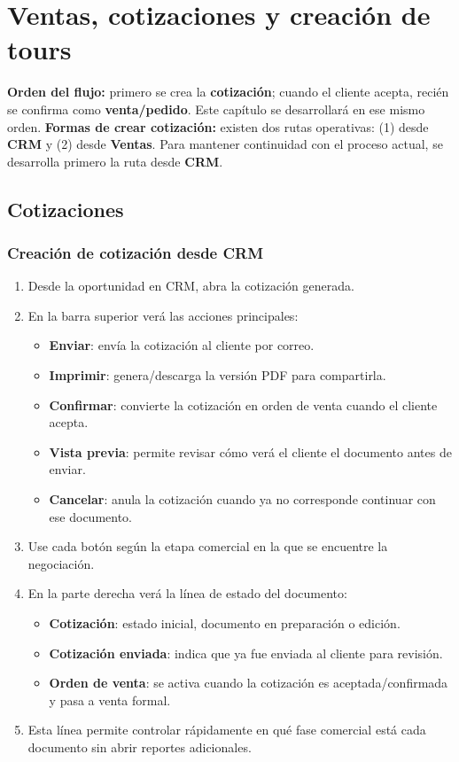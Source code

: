 \section{Ventas, cotizaciones y creación de tours}

\noindent\textbf{Orden del flujo:} primero se crea la \textbf{cotización}; cuando el cliente acepta, recién se confirma como \textbf{venta/pedido}. Este capítulo se desarrollará en ese mismo orden.
\noindent\textbf{Formas de crear cotización:} existen dos rutas operativas: (1) desde \textbf{CRM} y (2) desde \textbf{Ventas}. Para mantener continuidad con el proceso actual, se desarrolla primero la ruta desde \textbf{CRM}.

\subsection{Cotizaciones}
\subsubsection{Creación de cotización desde CRM}

\begin{enumerate}
    \item Desde la oportunidad en CRM, abra la cotización generada.
    \item En la barra superior verá las acciones principales:
    \begin{itemize}
        \item \textbf{Enviar}: envía la cotización al cliente por correo.
        \item \textbf{Imprimir}: genera/descarga la versión PDF para compartirla.
        \item \textbf{Confirmar}: convierte la cotización en orden de venta cuando el cliente acepta.
        \item \textbf{Vista previa}: permite revisar cómo verá el cliente el documento antes de enviar.
        \item \textbf{Cancelar}: anula la cotización cuando ya no corresponde continuar con ese documento.
    \end{itemize}
    \item Use cada botón según la etapa comercial en la que se encuentre la negociación.
    \item En la parte derecha verá la línea de estado del documento:
    \begin{itemize}
        \item \textbf{Cotización}: estado inicial, documento en preparación o edición.
        \item \textbf{Cotización enviada}: indica que ya fue enviada al cliente para revisión.
        \item \textbf{Orden de venta}: se activa cuando la cotización es aceptada/confirmada y pasa a venta formal.
    \end{itemize}
    \item Esta línea permite controlar rápidamente en qué fase comercial está cada documento sin abrir reportes adicionales.
\end{enumerate}

